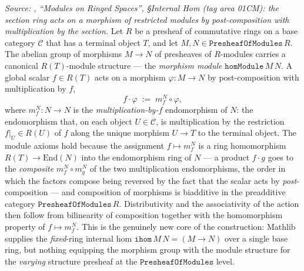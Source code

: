 \begin{definition}\label{mk-def:presheaf_internal_hom_value}
  \leanok

  \textit{Source: \cite{stacks-project}, ``Modules on Ringed Spaces'', \S Internal Hom
  (tag area 01CM): the section ring acts on a morphism of restricted modules by
  post-composition with multiplication by the section.}
  Let \(R\) be a presheaf of commutative rings on a base category \(\mathcal{C}\)
  that has a terminal object \(T\), and let \(M, N \in \mathtt{PresheafOfModules}\,R\).
  The abelian group of morphisms \(M \longrightarrow N\) of presheaves of \(R\)-modules
  carries a canonical \(R(T)\)-module structure --- the \emph{morphism module}
  \(\mathtt{homModule}\,M\,N\). A global scalar \(f \in R(T)\) acts on a morphism
  \(\varphi : M \to N\) by post-composition with multiplication by \(f\),
  \[
    f \cdot \varphi \;:=\; m_f^{N} \circ \varphi,
  \]
  where \(m_f^{N} : N \to N\) is the \emph{multiplication-by-\(f\)} endomorphism of
  \(N\): the endomorphism that, on each object \(U \in \mathcal{C}\), is multiplication
  by the restriction \(f|_U \in R(U)\) of \(f\) along the unique morphism \(U \to T\)
  to the terminal object. The module axioms hold because the assignment
  \(f \mapsto m_f^{N}\) is a ring homomorphism \(R(T) \to \mathrm{End}(N)\) into the
  endomorphism ring of \(N\) --- a product \(f \cdot g\) goes to the \emph{composite}
  \(m_f^{N} \circ m_g^{N}\) of the two multiplication endomorphisms, the order in which
  the factors compose being reversed by the fact that the scalar acts by
  \emph{post}-composition --- and composition of morphisms is biadditive in the
  preadditive category \(\mathtt{PresheafOfModules}\,R\). Distributivity and the
  associativity of the action then follow from bilinearity of composition together with
  the homomorphism property of \(f \mapsto m_f^{N}\). This is the genuinely new core of
  the construction: Mathlib supplies the \emph{fixed}-ring internal hom
  \(\mathtt{ihom}\,M\,N = (M \to N)\) over a single base ring, but nothing equipping the
  morphism group with the module structure for the \emph{varying} structure presheaf at
  the \(\mathtt{PresheafOfModules}\) level.
\end{definition}

